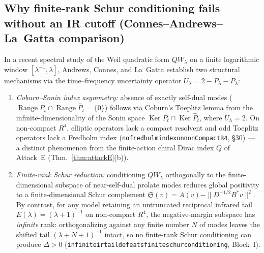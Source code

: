 \documentclass[11pt,a4paper]{article}
\def\R{R}\def\N{N}\def\Q{Q}\def\Z{Z}\def\Class{C}\def\OS{OS}\def\Gap{Gap}%
\theoremstyle{plain}
\theoremstyle{definition}
\theoremstyle{remark}
\newcommand{\R}{\mathbb{R}}\newcommand{\N}{\mathbb{N}}\newcommand{\Q}{\mathbb{Q}}
\newcommand{\Z}{\mathbb{Z}}\newcommand{\Spec}{\operatorname{Spec}}
\newcommand{\OS}{\mathrm{OS}}\newcommand{\Gap}{\mathrm{Gap}}
\newcommand{\Class}{\mathcal{C}}\newcommand{\Htot}{\mathcal{H}}
\renewcommand{\_}{\oldunderscore\allowbreak}
\newcommand{\Lean}[1]{\texttt{\small #1}}
\begin{document}
\subsection{Why finite-rank Schur conditioning fails without an IR cutoff (Connes--Andrews--La~Gatta comparison)}
In a recent spectral study of the Weil quadratic form $QW_\lambda$ on a finite logarithmic window
$[\lambda^{-1},\lambda]$, Andrews, Connes, and La~Gatta \cite{ConnesAndrewsLaGatta2026} establish
two structural mechanisms via the time--frequency uncertainty operator $U_\lambda = 2 - P_\lambda - \hat{P}_\lambda$:
\begin{enumerate}[label=(\roman*),leftmargin=22pt,itemsep=1pt]
\item \emph{Coburn--Sonin index asymmetry:} absence of exactly self-dual modes
($\operatorname{Range}P_t \cap \operatorname{Range}\hat{P}_t = \{0\}$) follows via Coburn's
Toeplitz lemma from the infinite-dimensionality of the Sonin space
$\operatorname{Ker}P_t \cap \operatorname{Ker}\hat{P}_t$, where $U_\lambda = 2$. On non-compact
$\R^4$, elliptic operators lack a compact resolvent and odd Toeplitz operators lack a Fredholm
index (\Lean{no\_fredholm\_index\_on\_nonCompact\_R4}, \S30) --- a distinct phenomenon from the
finite-action chiral Dirac index $Q$ of Attack~E (Thm.~\ref{thm:attackE}(b)).
\item \emph{Finite-rank Schur reduction:} conditioning $QW_\lambda$ orthogonally to the
finite-dimensional subspace of near-self-dual prolate modes reduces global positivity to a
finite-dimensional Schur complement $\mathfrak{S}(v) = A(v) - \|D^{-1/2}B^*v\|^2$. By contrast,
for any model retaining an untruncated reciprocal infrared tail $E(\lambda)=(\lambda+1)^{-1}$ on
non-compact $\R^4$, the negative-margin subspace has \emph{infinite} rank: orthogonalizing against
any finite number $N$ of modes leaves the shifted tail $(\lambda+N+1)^{-1}$ intact, so no
finite-rank Schur conditioning can produce $\Delta > 0$ (\Lean{infinite\_ir\_tail\_defeats\_finite\_schur\_conditioning}, Block~I).
\end{enumerate}
\end{document}
